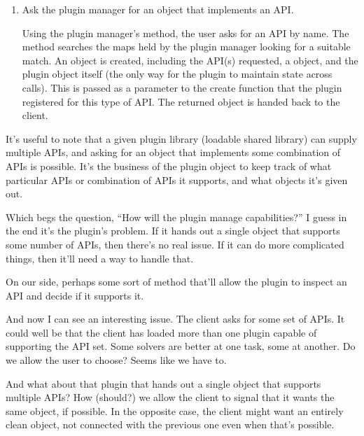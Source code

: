 \documentclass{article}
\begin{document}
\begin{enumerate}
  \item
  Ask the plugin manager for an object that implements an API.

  Using the plugin manager's  method, the user asks for an
  API by name.
  The  method searches the maps held by the plugin manager
  looking for a suitable match.
  An  object is created, including the API(s) requested, a
   object, and the plugin object itself (the only way
  for the plugin to maintain state across calls).
  This is passed as a parameter to the create function that the plugin
  registered for this type of API.
  The returned object is handed back to the client.
\end{enumerate}

It's useful to note that a given plugin library (loadable shared library)
can supply multiple APIs, and asking for an object that implements some
combination of APIs is possible.
It's the business of the plugin object to keep track of what particular APIs
or combination of APIs it supports, and what objects it's given out.

Which begs the question, ``How will the plugin manage capabilities?''
I guess in the end it's the plugin's problem.
If it hands out a single object that supports some number of APIs, then
there's no real issue.
If it can do more complicated things, then it'll need a way to handle that.

On our side, perhaps some sort of  method that'll
allow the plugin to inspect an API and decide if it supports it.

And now I can see an interesting issue.
The client asks for some set of APIs.
It could well be that the client has loaded more than one plugin capable of
supporting the API set.
Some solvers are better at one task, some at another.
Do we allow the user to choose?
Seems like we have to.

And what about that plugin that hands out a single object that supports
multiple APIs?
How (should?) we allow the client to signal that it wants the same object, if
possible.
In the opposite case, the client might want an entirely clean object, not
connected with the previous one even when that's possible.



\end{document}
